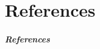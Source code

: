 \documentclass[11pt,compress]{beamer} %
\begin{document}
\part{References}
\begin{frame}[allowframebreaks]\frametitle{References}
\nocite{Owen2013VCG,Sobol01Global,Sob67,Prieur14,Owe98b,HicJim16a,Nie92,JoeKuo08,McKay79,Saltelli02}

\end{frame}
\end{document}
